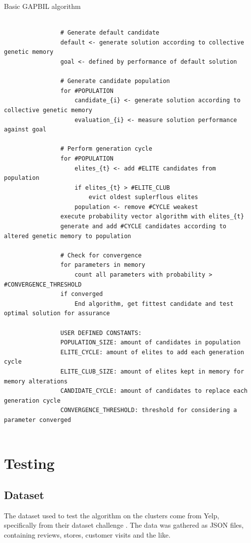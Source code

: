 \documentclass[a4paper,english]{report}
\begin{document}
			\begin{algorithm}
				\caption{Basic GAPBIL algorithm}\label{algo:overview}
				\scriptsize
				\begin{verbatim}
				
				# Generate default candidate
				default <- generate solution according to collective genetic memory
				goal <- defined by performance of default solution
				
				# Generate candidate population
				for #POPULATION
				    candidate_{i} <- generate solution according to collective genetic memory
				    evaluation_{i} <- measure solution performance against goal
				    
				# Perform generation cycle
				for #POPULATION
				    elites_{t} <- add #ELITE candidates from population
				    if elites_{t} > #ELITE_CLUB
				        evict oldest suplerflous elites
					population <- remove #CYCLE weakest
				execute probability vector algorithm with elites_{t}
				generate and add #CYCLE candidates according to altered genetic memory to population
				
				# Check for convergence
				for parameters in memory
				    count all parameters with probability > #CONVERGENCE_THRESHOLD
				if converged
				    End algorithm, get fittest candidate and test optimal solution for assurance
				
				USER DEFINED CONSTANTS:
				POPULATION_SIZE: amount of candidates in population
				ELITE_CYCLE: amount of elites to add each generation cycle
				ELITE_CLUB_SIZE: amount of elites kept in memory for memory alterations
				CANDIDATE_CYCLE: amount of candidates to replace each generation cycle
				CONVERGENCE_THRESHOLD: threshold for considering a parameter converged
				
				\end{verbatim}
			\end{algorithm}
		\section{Testing}
			\subsection{Dataset}
				The dataset used to test the algorithm on the clusters come from Yelp, specifically from their dataset challenge \cite{yelp}. The data was gathered as JSON files, containing reviews, stores, customer visits and the like.
\end{document}

